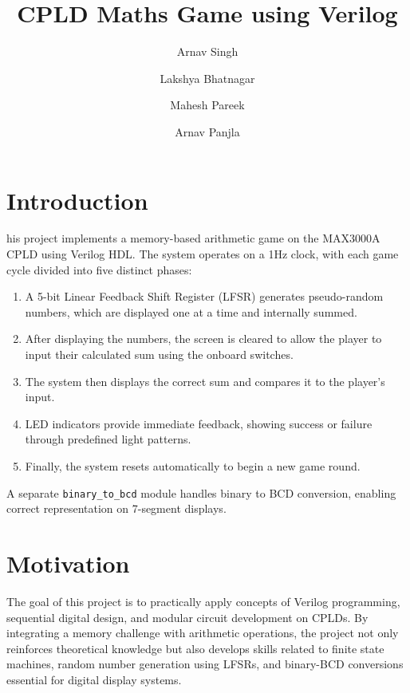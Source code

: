 \documentclass[10pt,a4paper,twocolumn,twoside]{tau-class/tau}
\title{CPLD Maths Game using Verilog}
\author[a]{Arnav Singh}
\author[b]{Lakshya Bhatnagar}
\author[c]{Mahesh Pareek}
\author[d]{Arnav Panjla}
\affil[a]{Arnav Singh, 2023EE10968}
\affil[b]{Lakshya Bhatnagar, 2023AM10945}
\affil[c]{Mahesh Pareek, 2023MT10586}
\affil[d]{Arnav Panjla, 2023EE10978}
\begin{document}
		
    \maketitle 
    \thispagestyle{firststyle} 
    \tauabstract 
    

\section{Introduction}

    his project implements a memory-based arithmetic game on the MAX3000A CPLD using Verilog HDL. The system operates on a 1Hz clock, with each game cycle divided into five distinct phases:
    
    \begin{enumerate}
        \item A 5-bit Linear Feedback Shift Register (LFSR) generates pseudo-random numbers, which are displayed one at a time and internally summed.
        \item After displaying the numbers, the screen is cleared to allow the player to input their calculated sum using the onboard switches.
        \item The system then displays the correct sum and compares it to the player's input.
        \item LED indicators provide immediate feedback, showing success or failure through predefined light patterns.
        \item Finally, the system resets automatically to begin a new game round.
    \end{enumerate}

A separate \texttt{binary\_to\_bcd} module handles binary to BCD conversion, enabling correct representation on 7-segment displays.
	
\section{Motivation}

    The goal of this project is to practically apply concepts of Verilog programming, sequential digital design, and modular circuit development on CPLDs. By integrating a memory challenge with arithmetic operations, the project not only reinforces theoretical knowledge but also develops skills related to finite state machines, random number generation using LFSRs, and binary-BCD conversions essential for digital display systems.
    
\end{document}
